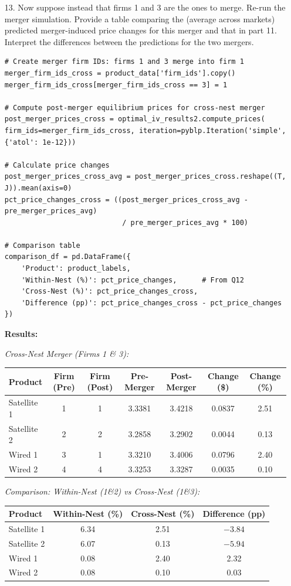 \documentclass[english,11pt]{article}
\begin{document}
\begin{enumerate}
\item[13.] Now suppose instead that firms 1 and 3 are the ones to merge.
Re-run the merger simulation. Provide a table comparing the (average
across markets) predicted merger-induced price changes for this merger and
that in part 11. Interpret the differences between the predictions for the
two mergers.

\begin{verbatim}
# Create merger firm IDs: firms 1 and 3 merge into firm 1
merger_firm_ids_cross = product_data['firm_ids'].copy()
merger_firm_ids_cross[merger_firm_ids_cross == 3] = 1

# Compute post-merger equilibrium prices for cross-nest merger
post_merger_prices_cross = optimal_iv_results2.compute_prices(
firm_ids=merger_firm_ids_cross, iteration=pyblp.Iteration('simple', {'atol': 1e-12}))

# Calculate price changes
post_merger_prices_cross_avg = post_merger_prices_cross.reshape((T, J)).mean(axis=0)
pct_price_changes_cross = ((post_merger_prices_cross_avg - pre_merger_prices_avg) 
                            / pre_merger_prices_avg * 100)

# Comparison table
comparison_df = pd.DataFrame({
    'Product': product_labels,
    'Within-Nest (%)': pct_price_changes,      # From Q12
    'Cross-Nest (%)': pct_price_changes_cross,
    'Difference (pp)': pct_price_changes_cross - pct_price_changes
})
\end{verbatim}

\textbf{Results:}

\textit{Cross-Nest Merger (Firms 1 \& 3):}

\begin{center}
\begin{tabular}{lcccccc}
\hline
Product & Firm (Pre) & Firm (Post) & Pre-Merger & Post-Merger & Change (\$) & Change (\%) \\
\hline
Satellite 1 & 1 & 1 & 3.3381 & 3.4218 & 0.0837 & 2.51 \\
Satellite 2 & 2 & 2 & 3.2858 & 3.2902 & 0.0044 & 0.13 \\
Wired 1 & 3 & 1 & 3.3210 & 3.4006 & 0.0796 & 2.40 \\
Wired 2 & 4 & 4 & 3.3253 & 3.3287 & 0.0035 & 0.10 \\
\hline
\end{tabular}
\end{center}

\textit{Comparison: Within-Nest (1\&2) vs Cross-Nest (1\&3):}

\begin{center}
\begin{tabular}{lccc}
\hline
Product & Within-Nest (\%) & Cross-Nest (\%) & Difference (pp) \\
\hline
Satellite 1 & 6.34 & 2.51 & $-3.84$ \\
Satellite 2 & 6.07 & 0.13 & $-5.94$ \\
Wired 1 & 0.08 & 2.40 & 2.32 \\
Wired 2 & 0.08 & 0.10 & 0.03 \\
\hline
\end{tabular}
\end{center}


\end{enumerate}
\end{document}
